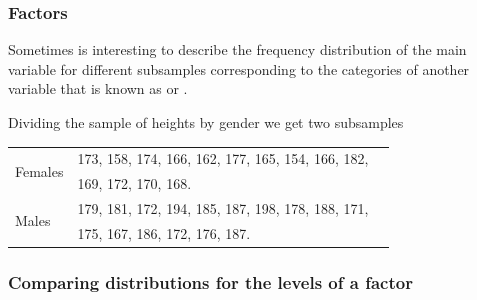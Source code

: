 \begin{frame}
\frametitle{Factors}
Sometimes is interesting to describe the frequency distribution of the main variable for different subsamples
corresponding to the categories of another variable that is known as  or
.

 Dividing the sample of heights by gender we get two subsamples
\begin{center}
\begin{tabular}{lll}
\hline
\multirow{2}{*}{Females} &
173, 158, 174, 166, 162, 177, 165, 154, 166, 182, \\
& 169, 172, 170, 168. \\
\hline
\multirow{2}{*}{Males} &
179, 181, 172, 194, 185, 187, 198, 178, 188, 171,\\
& 175, 167, 186, 172, 176, 187. \\
\hline
\end{tabular}
\end{center}
\end{frame}


\begin{frame}
\frametitle{Comparing distributions for the levels of a factor }

\begin{center} 
\scalebox{0.45}{}
\scalebox{0.45}{}
\end{center}
\end{frame}
